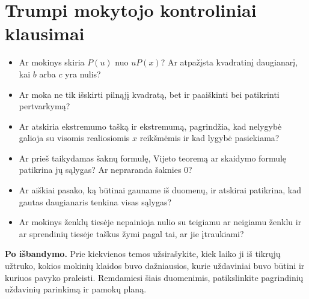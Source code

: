 \documentclass[11pt,a4paper]{article}
\begin{document}
\section*{Trumpi mokytojo kontroliniai klausimai}
\begin{itemize}
\item Ar mokinys skiria $P(u)$ nuo $uP(x)$? Ar atpažįsta kvadratinį daugianarį, kai $b$ arba $c$ yra nulis?
\item Ar moka ne tik išskirti pilnąjį kvadratą, bet ir paaiškinti bei patikrinti pertvarkymą?
\item Ar atskiria ekstremumo tašką ir ekstremumą, pagrindžia, kad nelygybė galioja su visomis realiosiomis $x$ reikšmėmis ir kad lygybė pasiekiama?
\item Ar prieš taikydamas šaknų formulę, Vijeto teoremą ar skaidymo formulę patikrina jų sąlygas? Ar nepraranda šaknies $0$?
\item Ar aiškiai pasako, ką būtinai gauname iš duomenų, ir atskirai patikrina, kad gautas daugianaris tenkina visas sąlygas?
\item Ar mokinys ženklų tiesėje nepainioja nulio su teigiamu ar neigiamu ženklu ir ar sprendinių tiesėje taškus žymi pagal tai, ar jie įtraukiami?
\end{itemize}
\textbf{Po išbandymo.} Prie kiekvienos temos užsirašykite, kiek laiko ji iš tikrųjų užtruko, kokios mokinių klaidos buvo dažniausios, kurie uždaviniai buvo būtini ir kuriuos pavyko praleisti. Remdamiesi šiais duomenimis, patikslinkite pagrindinių uždavinių parinkimą ir pamokų planą.
\end{document}
